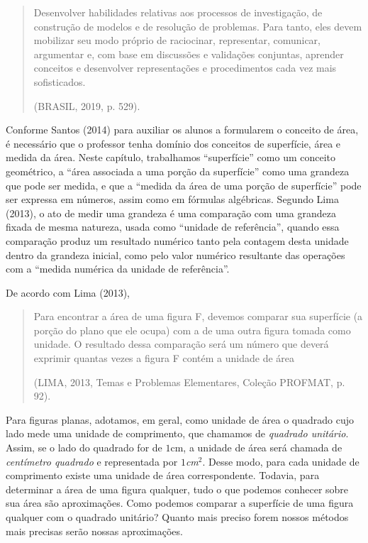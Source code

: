 \begin{paginatexto}
\begin{quote}
Desenvolver habilidades relativas aos processos de investigação, de construção de modelos e de resolução de problemas. Para tanto, eles devem mobilizar seu modo próprio de raciocinar, representar, comunicar, argumentar e, com base em discussões e validações conjuntas, aprender conceitos e desenvolver representações e procedimentos cada vez mais sofisticados.

\flushright
(BRASIL, 2019, p. 529).
\end{quote}

Conforme Santos (2014) para auxiliar os alunos a formularem o conceito de área, é necessário que o professor tenha domínio dos conceitos de superfície, área e medida da área. Neste capítulo, trabalhamos “superfície” como um conceito geométrico, a “área associada a uma porção da superfície” como uma grandeza que pode ser medida, e que a “medida da área de uma porção de superfície” pode ser expressa em números, assim como em fórmulas algébricas. Segundo Lima (2013), o ato de medir uma grandeza é uma comparação com uma grandeza fixada de mesma natureza, usada como “unidade de referência”, quando essa comparação produz um resultado numérico tanto pela contagem desta unidade dentro da grandeza inicial, como pelo valor numérico resultante das operações com a “medida numérica da unidade de referência”.

De acordo com Lima (2013), 

\begin{quote}
Para encontrar a área de uma figura F, devemos comparar sua superfície (a porção do plano que ele ocupa) com a de uma outra figura tomada como unidade. O resultado dessa comparação será um número que deverá exprimir quantas vezes a figura F contém a unidade de área 

\flushright
(LIMA, 2013, Temas e Problemas Elementares, Coleção PROFMAT, p. 92).
\end{quote}

Para figuras planas, adotamos, em geral, como unidade de área o quadrado cujo lado mede uma unidade de comprimento, que chamamos de \textit{quadrado unitário}. Assim, se o lado do quadrado for de $1$cm, a unidade de área será chamada de \textit{centímetro quadrado} e representada por $1$\textit{cm}$^2$. Desse modo, para cada unidade de comprimento existe uma unidade de área correspondente. Todavia, para determinar a área de uma figura qualquer, tudo o que podemos conhecer sobre sua área são aproximações. Como podemos comparar a superfície de uma figura qualquer com o quadrado unitário? Quanto mais preciso forem nossos métodos mais precisas serão nossas aproximações.


\end{paginatexto}
